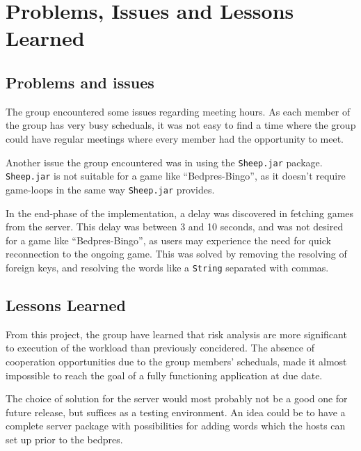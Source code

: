 \section{Problems, Issues and Lessons Learned}
\label{sec:issues}

\subsection{Problems and issues}
The group encountered some issues regarding meeting hours. As each member
of the group has very busy scheduals, it was not easy to find a time
where the group could have regular meetings where every member
had the opportunity to meet.

Another issue the group encountered
was in using the \texttt{Sheep.jar} package. \texttt{Sheep.jar} is not
suitable for a game like ``Bedpres-Bingo'', as it doesn't require game-loops in the same way \texttt{Sheep.jar} provides.

In the end-phase of the implementation, a delay was discovered in
fetching games from the server. This delay was between 3 and 10 seconds,
and was not desired for a game like ``Bedpres-Bingo'', as users may
experience the need for quick reconnection to the ongoing game. This
was solved by removing the resolving of foreign keys, and resolving
the words like a \texttt{String} separated with commas.

\subsection{Lessons Learned}
From this project, the group have learned that risk analysis are more
significant to execution of the workload than previously concidered.
The absence of cooperation opportunities due to the group members' scheduals,
made it almost impossible to reach the goal of a fully functioning application
at due date.

The choice of solution for the server would most probably not be a good
one for future release, but suffices as a testing environment. An idea
could be to have a complete server package with possibilities for adding
words which the hosts can set up prior to the bedpres.
